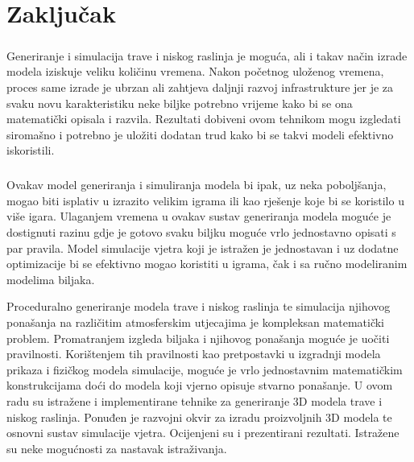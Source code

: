 \documentclass[times, utf8, diplomski]{fer}
\begin{document}
\chapter{Zaključak}
\paragraph{}
Generiranje i simulacija trave i niskog raslinja je moguća, ali i takav način izrade 
modela iziskuje veliku količinu vremena. Nakon početnog uloženog vremena, proces same izrade 
je ubrzan ali zahtjeva daljnji razvoj infrastrukture jer je za svaku novu karakteristiku 
neke biljke potrebno vrijeme kako bi se ona matematički opisala i razvila. Rezultati 
dobiveni ovom tehnikom mogu izgledati siromašno i potrebno je uložiti dodatan trud kako bi 
se takvi modeli efektivno iskoristili.

\paragraph{}
Ovakav model generiranja i simuliranja modela bi ipak, uz neka poboljšanja, mogao biti 
isplativ u izrazito velikim igrama ili kao rješenje koje bi se koristilo u više igara. 
Ulaganjem vremena u ovakav sustav generiranja modela moguće je dostignuti razinu gdje je 
gotovo svaku biljku moguće vrlo jednostavno opisati s par pravila. Model simulacije vjetra 
koji je istražen je jednostavan i uz dodatne optimizacije bi se efektivno mogao koristiti u 
igrama, čak i sa ručno modeliranim modelima biljaka.


\listoffigures

\lstlistoflistings
{}




\begin{sazetak}
Proceduralno generiranje modela trave i niskog raslinja te simulacija njihovog ponašanja na 
različitim atmosferskim utjecajima je kompleksan matematički problem. Promatranjem izgleda 
biljaka i njihovog ponašanja moguće je uočiti pravilnosti. Korištenjem tih pravilnosti kao 
pretpostavki u izgradnji modela prikaza i fizičkog modela simulacije, moguće je vrlo 
jednostavnim matematičkim konstrukcijama doći do modela koji vjerno opisuje stvarno 
ponašanje. U ovom radu su istražene i implementirane tehnike za generiranje 3D modela trave 
i niskog raslinja. Ponuđen je razvojni okvir za izradu proizvoljnih 3D modela te osnovni 
sustav simulacije vjetra. Ocijenjeni su i prezentirani rezultati. Istražene su neke 
mogućnosti za nastavak istraživanja.

\end{sazetak}
\end{document}
